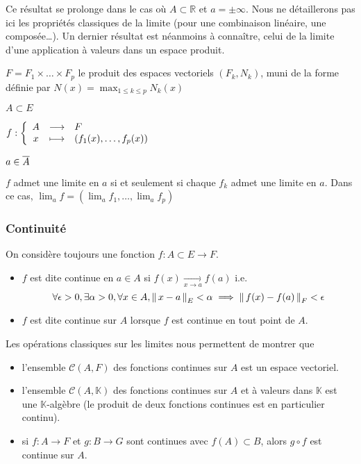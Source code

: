     Ce résultat se prolonge dans le cas où $A \subset \mathbb{R}$ et $a = \pm \infty$. Nous ne détaillerons pas ici les propriétés classiques de la limite (pour une combinaison linéaire, une composée\ldots). Un dernier résultat est néanmoins à connaître, celui de la limite d’une application à valeurs dans un espace produit.

    \begin{prop}{}{}
        \begin{soient}
            \item $F = F_1 \times \ldots \times F_p$ le produit des espaces vectoriels $(F_k, N_k)$, muni de la forme définie par $N(x) = \max_{1 \leq k \leq p} N_k(x)$
            \item $A \subset E$
            \item $\fonction{f}{A}{F}{x}{\left(f_1(x), \ldots, f_p(x)\right)}$
            \item $a \in \overline{A}$
        \end{soient}
        $f$ admet une limite en $a$ si et seulement si chaque $f_k$ admet une limite en $a$. Dans ce cas, $\lim_a f = \left(\lim_a f_1,\ldots, \lim_a f_p\right)$
    \end{prop}

    \subsubsection{Continuité}

    On considère toujours une fonction $f : A \subset E \rightarrow F$.

    \begin{defi}{}{}
        \begin{itemize}
            \item $f$ est dite continue en $a \in A$ si $f(x) \underset{x \rightarrow a}{\longrightarrow} f(a)$ i.e.
            \[ \forall \epsilon > 0, \exists \alpha > 0, \forall x \in A, \left\lVert \,x-a \, \right\rVert_E < \alpha \implies \left\lVert \,f(x) - f(a) \, \right\rVert_F < \epsilon \]
            \item $f$ est dite continue sur $A$ lorsque $f$ est continue en tout point de $A$.
        \end{itemize}
    \end{defi}

    Les opérations classiques sur les limites nous permettent de montrer que 
    \begin{itemize}
        \item l’ensemble $\mathcal{C}(A,F)$ des fonctions continues sur $A$ est un espace vectoriel.
        \item l’ensemble $\mathcal{C}(A,\mathbb{K})$ des fonctions continues sur $A$ et à valeurs dans $\mathbb{K}$ est une $\mathbb{K}$-algèbre (le produit de deux fonctions continues est en particulier continu).
        \item si $f : A \rightarrow F$ et $g : B \rightarrow G$ sont continues avec $f(A) \subset B$, alors $g \circ f$ est continue sur $A$.
    \end{itemize}

